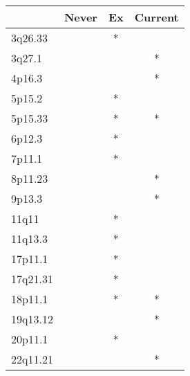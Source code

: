 \begin{tabular}{lccc}
\toprule
{} & Never & Ex & Current \\
\midrule
3q26.33  &       &  * &         \\
3q27.1   &       &    &       * \\
4p16.3   &       &    &       * \\
5p15.2   &       &  * &         \\
5p15.33  &       &  * &       * \\
6p12.3   &       &  * &         \\
7p11.1   &       &  * &         \\
8p11.23  &       &    &       * \\
9p13.3   &       &    &       * \\
11q11    &       &  * &         \\
11q13.3  &       &  * &         \\
17p11.1  &       &  * &         \\
17q21.31 &       &  * &         \\
18p11.1  &       &  * &       * \\
19q13.12 &       &    &       * \\
20p11.1  &       &  * &         \\
22q11.21 &       &    &       * \\
\bottomrule
\end{tabular}

